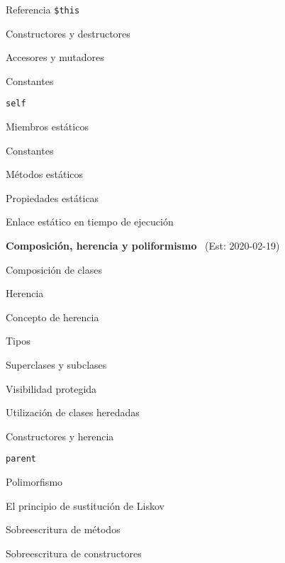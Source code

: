\begin{longenum}
\begin{longenum}
\begin{longenum}
            \item Referencia \texttt{\$this}
            \item Constructores y destructores
            \item Accesores y mutadores
        \end{longenum}
        \item Constantes
        \begin{longenum}
            \item \texttt{self}
        \end{longenum}
        \item Miembros estáticos
        \begin{longenum}
            \item Constantes
            \item Métodos estáticos
            \item Propiedades estáticas
            \item Enlace estático en tiempo de ejecución
        \end{longenum}
    \end{longenum}
    \item \textbf{Composición, herencia y poliformismo} \ (Est: 2020-02-19)
    \begin{longenum}
        \item Composición de clases
        \item Herencia
        \begin{longenum}
            \item Concepto de herencia
            \item Tipos
            \item Superclases y subclases
            \item Visibilidad protegida
            \item Utilización de clases heredadas
            \item Constructores y herencia
            \item \texttt{parent}
        \end{longenum}
        \item Polimorfismo
        \begin{longenum}
            \item El principio de sustitución de Liskov
            \item Sobreescritura de métodos
            \item Sobreescritura de constructores
        \end{longenum}

\end{longenum}
\end{longenum}

